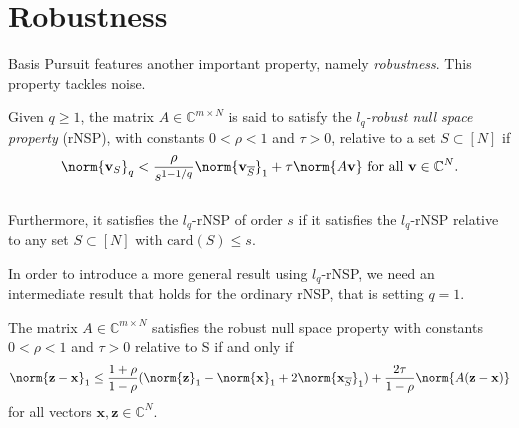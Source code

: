 \section*{Robustness}

Basis Pursuit features another important property, namely \emph{robustness}.
This property tackles noise.


\begin{tcolorbox}[colback=blue,colframe=white]
\begin{definition}
Given $q \geq 1$, the matrix $A \in \mathbb{C}^{m \times N}$ is said to satisfy the $l_q$\emph{-robust null space property} (rNSP), with constants $0 < \rho < 1$ and $ \tau > 0$, relative to a set $S \subset [N]$ if 
\begin{equation*}
\norm{ \mathbf{v}_{S}}_{q}  <  \frac{\rho}{s^{1-1/q}} \norm{ \mathbf{v}_{\overline{S}}}_{1} + \tau \norm{A\mathbf{v}} \ \text{for all} \ \mathbf{v} \in \mathbb{C}^{N}.
\end{equation*}
\\ Furthermore, it satisfies the $l_q$-rNSP of order $s$ if it satisfies the $l_q$-rNSP relative to any set $S \subset [N]$ with $\text{card}(S) \leq s$.

\end{definition}
\end{tcolorbox}

In order to introduce a more general result using $l_q$-rNSP, we need an intermediate result that holds for the ordinary rNSP, that is setting $q = 1. $


\begin{tcolorbox}[colback=yellow,colframe=white]
\begin{theorem}
The matrix $A \in \mathbb{C}^{m \times N}$ satisfies the robust null space property with constants $ 0 < \rho < 1$ and $ \tau > 0 $ relative to S if and only if
\begin{equation}
\norm{\mathbf{z-x}}_{1} \leq \frac{1 + \rho}{1 - \rho}(\norm{\mathbf{z}}_1-\norm{\mathbf{x}}_1+2 \norm{\mathbf{x}_{\overline{S}}}_{1}) + \frac{2\tau}{1-\rho}\norm{A(\mathbf{z-x})}
\end{equation}
for all vectors $\mathbf{x,z} \in \mathbb{C}^{N}.$
\end{theorem}
\end{tcolorbox}

